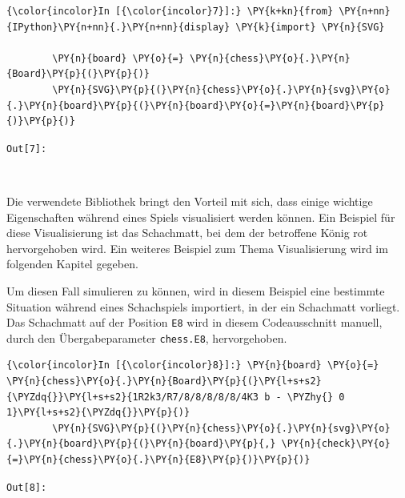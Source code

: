     \begin{Verbatim}[commandchars=\\\{\}]
{\color{incolor}In [{\color{incolor}7}]:} \PY{k+kn}{from} \PY{n+nn}{IPython}\PY{n+nn}{.}\PY{n+nn}{display} \PY{k}{import} \PY{n}{SVG}
        
        \PY{n}{board} \PY{o}{=} \PY{n}{chess}\PY{o}{.}\PY{n}{Board}\PY{p}{(}\PY{p}{)}
        \PY{n}{SVG}\PY{p}{(}\PY{n}{chess}\PY{o}{.}\PY{n}{svg}\PY{o}{.}\PY{n}{board}\PY{p}{(}\PY{n}{board}\PY{o}{=}\PY{n}{board}\PY{p}{)}\PY{p}{)} 
\end{Verbatim}

\texttt{\color{outcolor}Out[{\color{outcolor}7}]:}
    
    \begin{center}
    \end{center}
    { \hspace*{\fill} \\}
    

    Die verwendete Bibliothek bringt den Vorteil mit sich, dass einige
wichtige Eigenschaften während eines Spiels visualisiert werden können.
Ein Beispiel für diese Visualisierung ist das Schachmatt, bei dem der
betroffene König rot hervorgehoben wird. Ein weiteres Beispiel zum
Thema Visualisierung wird im folgenden Kapitel gegeben.

Um diesen Fall simulieren zu können, wird in diesem Beispiel eine
bestimmte Situation während eines Schachspiels importiert, in der ein
Schachmatt vorliegt. Das Schachmatt auf der Position \texttt{E8} wird in
diesem Codeausschnitt manuell, durch den Übergabeparameter
\texttt{chess.E8}, hervorgehoben.

    \begin{Verbatim}[commandchars=\\\{\}]
{\color{incolor}In [{\color{incolor}8}]:} \PY{n}{board} \PY{o}{=} \PY{n}{chess}\PY{o}{.}\PY{n}{Board}\PY{p}{(}\PY{l+s+s2}{\PYZdq{}}\PY{l+s+s2}{1R2k3/R7/8/8/8/8/8/4K3 b - \PYZhy{} 0 1}\PY{l+s+s2}{\PYZdq{}}\PY{p}{)}
        \PY{n}{SVG}\PY{p}{(}\PY{n}{chess}\PY{o}{.}\PY{n}{svg}\PY{o}{.}\PY{n}{board}\PY{p}{(}\PY{n}{board}\PY{p}{,} \PY{n}{check}\PY{o}{=}\PY{n}{chess}\PY{o}{.}\PY{n}{E8}\PY{p}{)}\PY{p}{)}
\end{Verbatim}

\texttt{\color{outcolor}Out[{\color{outcolor}8}]:}
    
    \begin{center}
    \end{center}
    { \hspace*{\fill} \\}
    

